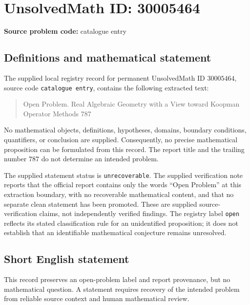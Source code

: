 \documentclass[11pt]{article}
\begin{document}
\section*{UnsolvedMath ID: 30005464}
\textbf{Source problem code:} catalogue entry
\subsection{Definitions and mathematical statement}
The supplied local registry record for permanent UnsolvedMath ID \(30005464\), source code \texttt{catalogue entry}, contains the following extracted text:
\begin{quote}
Open Problem. Real Algebraic Geometry with a View toward Koopman Operator Methods 787
\end{quote}
No mathematical objects, definitions, hypotheses, domains, boundary conditions, quantifiers, or conclusion are supplied. Consequently, no precise mathematical proposition can be formulated from this record. The report title and the trailing number \(787\) do not determine an intended problem.

The supplied statement status is \texttt{unrecoverable}. The supplied verification note reports that the official report contains only the words ``Open Problem'' at this extraction boundary, with no recoverable mathematical content, and that no separate clean statement has been promoted. These are supplied source-verification claims, not independently verified findings. The registry label \texttt{open} reflects its stated classification rule for an unidentified proposition; it does not establish that an identifiable mathematical conjecture remains unresolved.
\subsection{Short English statement}
This record preserves an open-problem label and report provenance, but no mathematical question. A statement requires recovery of the intended problem from reliable source context and human mathematical review.
\end{document}
